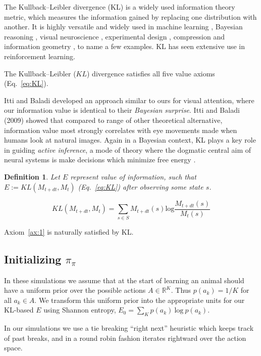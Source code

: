 \documentclass[9pt,lineno]{elife}
\newtheorem{definition}{Definition}
\begin{document}
The Kullback--Leibler divergence (KL) is a widely used information theory metric, which measures the information gained by replacing one distribution with another. It is highly versatile and widely used in machine learning \citep{Goodfellow-et-al-2016}, Bayesian reasoning \citep{Itti2009,Friston2016}, visual neuroscience \citep{Itti2009}, experimental design \citep{Lopez-Fidalgo2007}, compression \citep{Mackay,Still2012} and information geometry \citep{Ay2015}, to name a few examples. KL has seen extensive use in reinforcement learning. %

The Kullback--Leibler ($KL$) divergence satisfies all five value axioms (Eq.~\ref{eq:KL}). 

Itti and Baladi  developed an approach similar to ours for visual attention, where our information value is identical to their \textit{Bayesian surprise}. Itti and Baladi (2009) showed that compared to range of other theoretical alternative, information value most strongly correlates with eye movements made when humans look at natural images. Again in a Bayesian context, KL plays a key role in guiding \textit{active inference}, a mode of theory where the dogmatic central aim of neural systems is make decisions which minimize free energy \citep{Friston2016,Schwartenbeck2019}. 

\begin{definition}
    Let $E$ represent value of information, such that $E := KL(M_{t+dt}, M_t)$ (Eq.~\ref{eq:KL}) after observing some state $s$.
\end{definition}

\begin{equation}
    KL(M_{t+dt}, M_t) = \sum_{s \in S} M_{t+dt}(s) \text{log} \frac{M_{t+dt}(s)}{M_t(s)} 
    \label{eq:KL}
\end{equation}

Axiom~\ref{ax:1} is naturally satisfied by KL. 

\subsection*{Initializing $\pi_\pi$}
In these simulations we assume that at the start of learning an animal should have a uniform prior over the possible actions $A \in \mathbb{R}^K$. Thus $p(a_k) = 1/K$ for all $a_k \in A$. We transform this uniform prior into the appropriate units for our KL-based $E$ using Shannon entropy, $E_0 = \sum_K p(a_k)\ \text{log}\ p(a_k)$. 

In our simulations we use a tie breaking ``right next'' heuristic which keeps track of past breaks, and in a round robin fashion iterates rightward over the action space.
\end{document}
